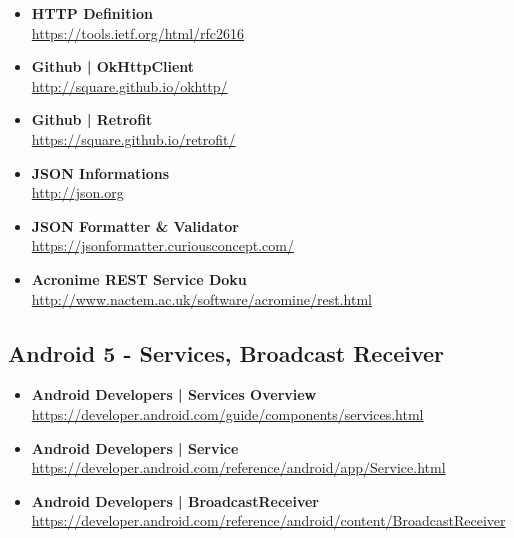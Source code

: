 \documentclass[a4paper]{article}
\begin{document}
{\begin{itemize}
		\item \textbf{HTTP Definition}\\
		\href{https://tools.ietf.org/html/rfc2616}
		{https://tools.ietf.org/html/rfc2616}
		
		\item \textbf{Github | OkHttpClient}\\
		\href{http://square.github.io/okhttp/}
		{http://square.github.io/okhttp/}
		
		\item \textbf{Github | Retrofit}\\
		\href{https://square.github.io/retrofit/}
		{https://square.github.io/retrofit/}
		
		\item \textbf{JSON Informations}\\
		\href{http://json.org}
		{http://json.org}
		
		\item \textbf{JSON Formatter \& Validator}\\
		\href{https://jsonformatter.curiousconcept.com/}
		{https://jsonformatter.curiousconcept.com/}
		
		\item \textbf{Acronime REST Service Doku}\\
		\href{http://www.nactem.ac.uk/software/acromine/rest.html}
		{http://www.nactem.ac.uk/software/acromine/rest.html}
		
	\end{itemize}
	
	\subsection{Android 5 - Services, Broadcast Receiver}
	
	\begin{itemize}
		
		\item \textbf{Android Developers | Services Overview}\\
		\href{https://developer.android.com/guide/components/services.html}
		{https://developer.android.com/guide/components/services.html}
		
		\item \textbf{Android Developers | Service}\\
		\href{https://developer.android.com/reference/android/app/Service.html}
		{https://developer.android.com/reference/android/app/Service.html}		
		
		\item \textbf{Android Developers | BroadcastReceiver}\\
		\href{https://developer.android.com/reference/android/content/BroadcastReceiver}
		{https://developer.android.com/reference/android/content/BroadcastReceiver}	
		

\end{itemize}}
\end{document}
